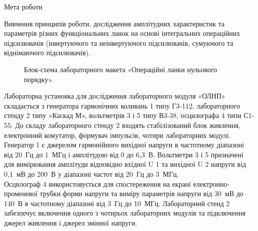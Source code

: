 \documentclass[a4paper,14pt]{extreport}
\begin{document}
\begin{center}Мета роботи\end{center}\par
Вивчення принципів роботи, дослідження амплітудних
характеристик та параметрів різних функціональних ланок на основі
інтегральних операційних підсилювачів (інвертуючого та неінвертуючого
підсилювачів, сумуючого та віднімаючого підсилювачів).

\begin{figure}[h]
\caption{Блок-схема лабораторного макета «Операційні ланки нульового
порядку».}
\end{figure}\par

Лабораторна установка для дослідження лабораторного модуля
«ОЛНП» складається з генератора гармонічних коливань 1 типу Г3-112,
лабораторного стенду 2 типу «Каскад М», вольтметрів 3 і 5 типу В3-38,
осцилографа 4 типи С1-55. До складу лабораторного стенду 2 входять
стабілізований блок живлення, електронний комутатор, формувач
імпульсів, чотири лабораторних модулі.\\

Генератор 1 є джерелом гармонійного вихідної напруги в частотному
діапазоні від 20 Гц до 1 МГц і амплітудою від 0 до 6,3 В.
Вольтметри 3 і 5 призначені для вимірювання амплітуди відповідно
вхідної U 1 та вихідної U 2 напруги від 0,1 мВ до 200 В у діапазоні частот від
20 Гц до 3 МГц.\\

Осцилограф 4 використовується для спостереження на екрані
електронно-променевої трубки форми напруги та виміру параметрів
напруги від 30 мВ до 140 В в частотному діапазоні від 3 Гц до 10 МГц.
Лабораторний стенд 2 забезпечує включення одного з чотирьох
лабораторних модулів та підключення джерел живлення і джерел змінної
напруги.\\
\newpage




\begin{figure}[h]
\end{figure}

\begin{figure}[h]
\end{figure}
\end{document}
